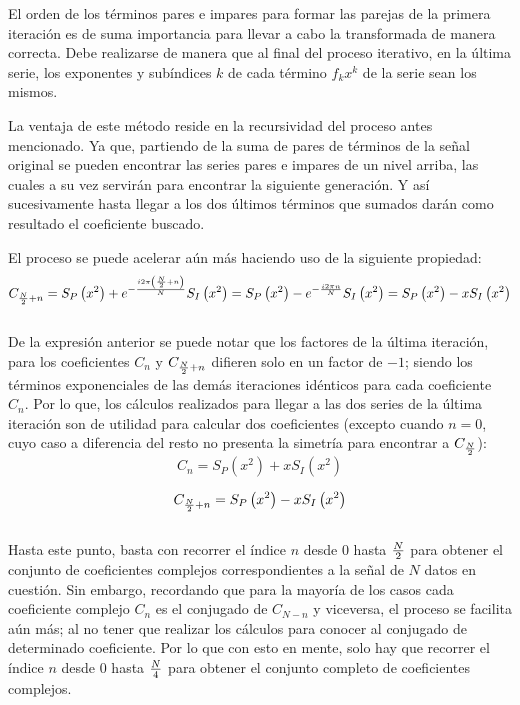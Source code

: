El orden de los términos pares e impares para formar las parejas de la primera iteración es de suma importancia para llevar a cabo la transformada de manera correcta. 
Debe realizarse de manera que al final del proceso iterativo, en la última serie, los exponentes y subíndices $k$ de cada término $f_{k}x^{k}$ de la serie sean los mismos.

La ventaja de este método reside en la recursividad del proceso antes mencionado. 
Ya que, partiendo de la suma de pares de términos de la señal original se pueden encontrar las series pares e impares de un nivel arriba, las cuales a su vez servirán para encontrar la siguiente generación. 
Y así sucesivamente hasta llegar a los dos últimos términos que sumados darán como resultado el coeficiente buscado.

El proceso se puede acelerar aún más haciendo uso de la siguiente propiedad:\\

$$C_{{N\over 2}+n}=S_{P}\left( x^{2}\right) + e^{-{{i2\pi \left({N\over 2}+n\right)}\over N}}S_{I}\left( x^{2}\right)=S_{P}\left( x^{2}\right) - e^{-{{i2\pi n}\over N}}S_{I}\left( x^{2}\right)=S_{P}\left( x^{2}\right) - xS_{I}\left( x^{2}\right)$$\\

De la expresión anterior se puede notar que los factores de la última iteración, para los coeficientes $C_{n}$ y $C_{{N\over 2}+n}$ difieren solo en un factor de $-1$; siendo los términos exponenciales de las demás iteraciones idénticos para cada coeficiente $C_{n}$. 
Por lo que, los cálculos realizados para llegar a las dos series de la última iteración son de utilidad para calcular dos coeficientes (excepto cuando $n=0$, cuyo caso a diferencia del resto no presenta la simetría para encontrar a $C_{N\over 2}$):\\

$$C_{n}=S_{P}\left( x^{2}\right) + xS_{I}\left( x^{2}\right)$$

$$C_{{N\over 2}+n}=S_{P}\left( x^{2}\right) - xS_{I}\left( x^{2}\right)$$\\

Hasta este punto, basta con recorrer el índice $n$ desde 0 hasta ${N\over 2}$ para obtener el conjunto de coeficientes complejos correspondientes a la señal de $N$ datos en cuestión. 
Sin embargo, recordando que para la mayoría de los casos cada coeficiente complejo $C_{n}$ es el conjugado de $C_{N-n}$ y viceversa, el proceso se facilita aún más; al no tener que realizar los cálculos para conocer al conjugado de determinado coeficiente. 
Por lo que con esto en mente, solo hay que recorrer el índice $n$ desde $0$ hasta $N\over 4$ para obtener el conjunto completo de coeficientes complejos.

